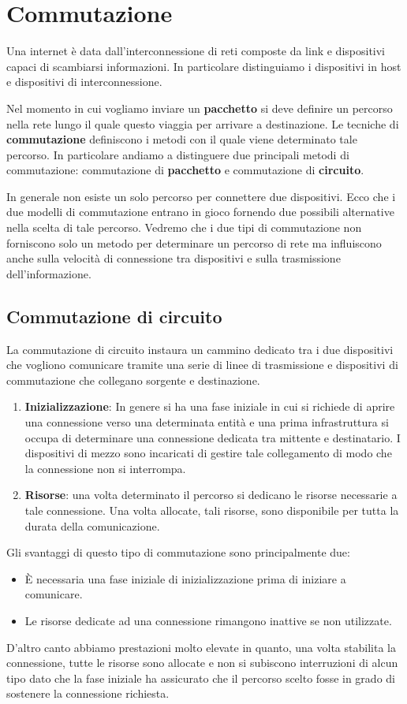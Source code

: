 \section{Commutazione}
Una internet è data dall'interconnessione di reti composte da link e dispositivi capaci di
scambiarsi informazioni. In particolare distinguiamo i dispositivi in host e dispositivi di
interconnessione.

Nel momento in cui vogliamo inviare un \textbf{pacchetto} si deve definire un percorso nella rete
lungo il quale questo viaggia per arrivare a destinazione. Le tecniche di \textbf{commutazione}
definiscono i metodi con il quale viene determinato tale percorso. In particolare andiamo a
distinguere due principali metodi di commutazione: commutazione di \textbf{pacchetto} e
commutazione di \textbf{circuito}.

In generale non esiste un solo percorso per connettere due dispositivi. Ecco che i due modelli di
commutazione entrano in gioco fornendo due possibili alternative nella scelta di tale percorso.
Vedremo che i due tipi di commutazione non forniscono solo un metodo per determinare un percorso
di rete ma influiscono anche sulla velocità di connessione tra dispositivi e sulla trasmissione
dell'informazione.

\subsection{Commutazione di circuito}
La commutazione di circuito instaura un cammino dedicato tra i due dispositivi che vogliono
comunicare tramite una serie di linee di trasmissione e dispositivi di commutazione che collegano
sorgente e destinazione.
\begin{enumerate}
	\item \textbf{Inizializzazione}: In genere si ha una fase iniziale in cui si richiede di
		aprire una connessione verso una determinata entità e una prima infrastruttura si occupa 
		di determinare una connessione dedicata tra mittente e destinatario. I dispositivi di 
		mezzo sono incaricati di gestire tale collegamento di modo che la connessione non si
		interrompa.
	\item \textbf{Risorse}: una volta determinato il percorso si dedicano le risorse necessarie 
		a tale connessione. Una volta allocate, tali risorse, sono disponibile per tutta la durata 
		della comunicazione.
\end{enumerate}
Gli svantaggi di questo tipo di commutazione sono principalmente due:
\begin{itemize}
	\item \`E necessaria una fase iniziale di inizializzazione prima di iniziare a comunicare.
	\item Le risorse dedicate ad una connessione rimangono inattive se non utilizzate.
\end{itemize}
D'altro canto abbiamo prestazioni molto elevate in quanto, una volta stabilita la connessione,
tutte le risorse sono allocate e non si subiscono interruzioni di alcun tipo dato che la fase 
iniziale ha assicurato che il percorso scelto fosse in grado di sostenere la connessione richiesta.

